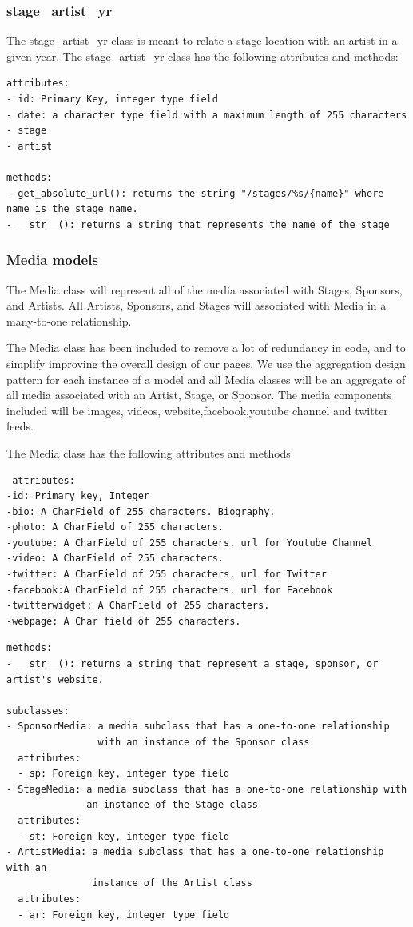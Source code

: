 \documentclass[12pt,english]{scrartcl}
\begin{document}
\subsubsection{stage\_artist\_yr}

The stage\_artist\_yr class is meant to relate a stage location with an artist in a given year.
The stage\_artist\_yr class has the following attributes and methods:
\begin{verbatim}
attributes:
- id: Primary Key, integer type field
- date: a character type field with a maximum length of 255 characters
- stage
- artist

methods:
- get_absolute_url(): returns the string "/stages/%s/{name}" where name is the stage name.
- __str__(): returns a string that represents the name of the stage
\end{verbatim}


\subsubsection{Media models}

The Media class will represent all of the media associated with Stages, Sponsors, and Artists. All Artists, Sponsors, and Stages will associated
with Media in a many-to-one relationship.

The Media class has been included to remove a lot of redundancy in code, and to simplify improving the overall 
design of our pages. We use the aggregation design pattern for each instance of a model and all Media classes will be an aggregate of all media
associated with an Artist, Stage, or Sponsor. The media components included will be images, videos, website,facebook,youtube channel and twitter feeds.

The Media class has the following attributes and methods
\begin{verbatim}
 attributes:
-id: Primary key, Integer
-bio: A CharField of 255 characters. Biography. 
-photo: A CharField of 255 characters. 
-youtube: A CharField of 255 characters. url for Youtube Channel
-video: A CharField of 255 characters.
-twitter: A CharField of 255 characters. url for Twitter
-facebook:A CharField of 255 characters. url for Facebook
-twitterwidget: A CharField of 255 characters.
-webpage: A Char field of 255 characters.
\end{verbatim}

\begin{verbatim}
methods:
- __str__(): returns a string that represent a stage, sponsor, or artist's website.

subclasses:
- SponsorMedia: a media subclass that has a one-to-one relationship 
                with an instance of the Sponsor class
  attributes:
  - sp: Foreign key, integer type field
- StageMedia: a media subclass that has a one-to-one relationship with 
              an instance of the Stage class
  attributes:
  - st: Foreign key, integer type field
- ArtistMedia: a media subclass that has a one-to-one relationship with an
               instance of the Artist class
  attributes:
  - ar: Foreign key, integer type field
  
\end{verbatim}
\end{document}
